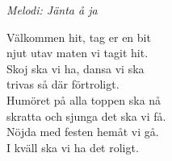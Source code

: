{\footnotesize\textit{Melodi: Jänta å ja}}\par
\vspace{10pt}
Välkommen hit, tag er en bit\\
njut utav maten vi tagit hit.\\
Skoj ska vi ha, dansa vi ska\\
trivas så där förtroligt.\\
Humöret på alla toppen ska nå\\
skratta och sjunga det ska vi få.\\
Nöjda med festen hemåt vi gå.\\
I kväll ska vi ha det roligt.
